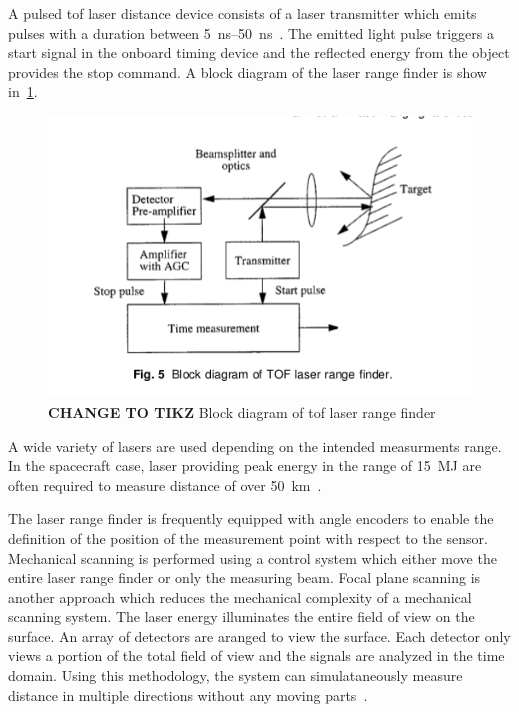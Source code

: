 A pulsed \gls{tof} laser distance device consists of a laser transmitter which emits pulses with a duration between \SIrange{5}{50}{\nano\second}~\cite{amann2001}.
The emitted light pulse triggers a start signal in the onboard timing device and the reflected energy from the object provides the stop command.
A block diagram of the laser range finder is show in~\cref{fig:lidar_block_diagram}.
\begin{figure}[htbp]
    \centering
    \includegraphics[width=\textwidth]{figures/raycasting/block_diagram.png}
    \caption{\textbf{CHANGE TO TIKZ} Block diagram of \gls{tof} laser range finder\label{fig:lidar_block_diagram}}
\end{figure}
A wide variety of lasers are used depending on the intended measurments range.
In the spacecraft case, laser providing peak energy in the range of \SI{15}{\mega\joule} are often required to measure distance of over \SI{50}{\kilo\meter}~\cite{berry2013}.

The laser range finder is frequently equipped with angle encoders to enable the definition of the position of the measurement point with respect to the sensor. 
Mechanical scanning is performed using a control system which  either move the entire laser range finder or only the measuring beam.
Focal plane scanning is another approach which reduces the mechanical complexity of a mechanical scanning system.
The laser energy illuminates the entire field of view on the surface.
An array of detectors are aranged to view the surface.
Each detector only views a portion of the total field of view and the signals are analyzed in the time domain.
Using this methodology, the system can simulataneously measure distance in multiple directions without any moving parts~\cite{amann2001}.

